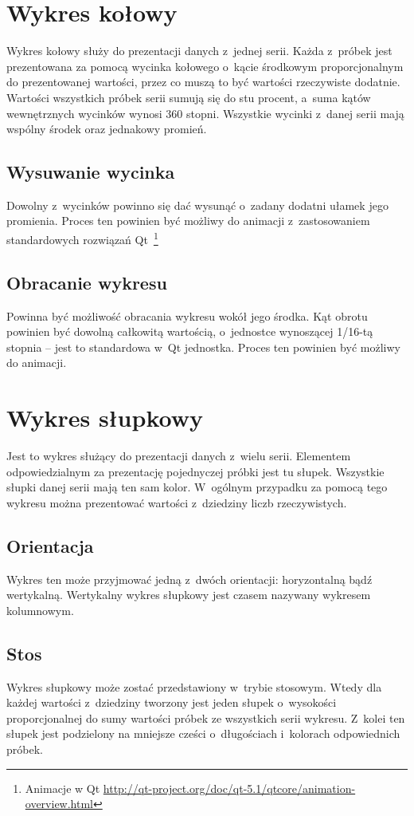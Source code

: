 \section{Wykres kołowy}
Wykres kołowy służy do prezentacji danych z~jednej serii. Każda z~próbek jest prezentowana za pomocą wycinka kołowego o~kącie środkowym proporcjonalnym do prezentowanej wartości, przez co muszą to być wartości rzeczywiste dodatnie. Wartości wszystkich próbek serii sumują się do stu procent, a~suma kątów wewnętrznych wycinków wynosi 360 stopni. Wszystkie wycinki z~danej serii mają wspólny środek oraz jednakowy promień.

\subsection{Wysuwanie wycinka}
Dowolny z~wycinków powinno się dać wysunąć o~zadany dodatni ułamek jego promienia. Proces ten powinien być możliwy do animacji z~zastosowaniem standardowych rozwiązań Qt~\footnote{Animacje w Qt \url{http://qt-project.org/doc/qt-5.1/qtcore/animation-overview.html}}

\subsection{Obracanie wykresu}
Powinna być możliwość obracania wykresu wokół jego środka. Kąt obrotu powinien być dowolną całkowitą wartością, o~jednostce wynoszącej 1/16-tą stopnia -- jest to standardowa w~Qt jednostka. Proces ten powinien być możliwy do animacji.
 

\section{Wykres słupkowy}
Jest to wykres służący do prezentacji danych z~wielu serii. Elementem odpowiedzialnym za prezentację pojednyczej próbki jest tu słupek. Wszystkie słupki danej serii mają ten sam kolor. W~ogólnym przypadku za pomocą tego wykresu można prezentować wartości z~dziedziny liczb rzeczywistych.

\subsection{Orientacja} 
Wykres ten może przyjmować jedną z~dwóch orientacji: horyzontalną bądź wertykalną. Wertykalny wykres słupkowy jest czasem nazywany wykresem kolumnowym. 

\subsection{Stos}
Wykres słupkowy może zostać przedstawiony w~trybie stosowym. Wtedy dla każdej wartości z~dziedziny tworzony jest jeden słupek o~wysokości proporcjonalnej do sumy wartości próbek ze wszystkich serii wykresu. Z~kolei ten słupek jest podzielony na mniejsze cześci o~długościach i~kolorach odpowiednich próbek.  


